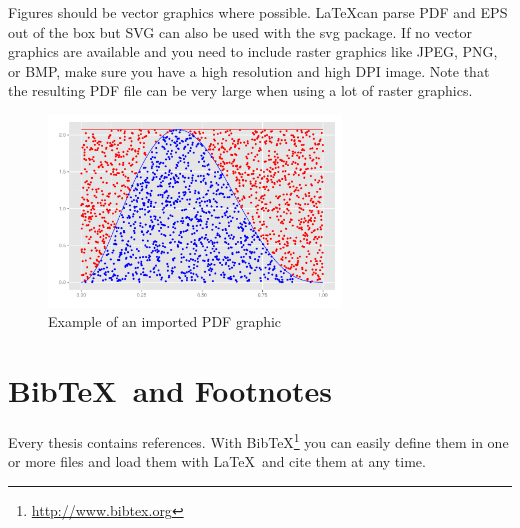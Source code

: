 \documentclass[bachelorarbeit,grey,english]{mas-thesis-sections}				%
\begin{document}
Figures should be vector graphics where possible. \LaTeX can parse PDF and EPS out of the box but SVG can also be used with the svg package. If no vector graphics are available and you need to include raster graphics like JPEG, PNG, or BMP, make sure you have a high resolution and high DPI image. Note that the resulting PDF file can be very large when using a lot of raster graphics.

\begin{figure}[ht]
	\centering
	\includegraphics[height=5.1cm]{graphics/demo-graphic.pdf}
	\caption{Example of an imported PDF graphic}
	\label{figure:1}
\end{figure}

\newpage

\section{Bib\TeX\ and Footnotes}

Every thesis contains references. With Bib\TeX\footnote{\url{http://www.bibtex.org}} you can easily define them in one or more files and load them with \LaTeX\ and cite them at any time.\cite{exampleBook}
\cleardoublepage

\printbibliography

\makelicensepageCCBYSA


% 
% 
% 
% 
% 
% 




\end{document}
